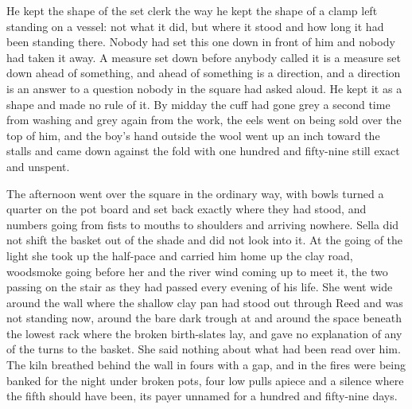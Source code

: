 He kept the shape of the set clerk the way he kept the shape of a clamp left standing on a vessel: not what it did, but where it stood and how long it had been standing there. Nobody had set this one down in front of him and nobody had taken it away. A measure set down before anybody called it is a measure set down ahead of something, and ahead of something is a direction, and a direction is an answer to a question nobody in the square had asked aloud. He kept it as a shape and made no rule of it. By midday the cuff had gone grey a second time from washing and grey again from the work, the eels went on being sold over the top of him, and the boy's hand outside the wool went up an inch toward the stalls and came down against the fold with one hundred and fifty-nine still exact and unspent.

The afternoon went over the square in the ordinary way, with bowls turned a quarter on the pot board and set back exactly where they had stood, and numbers going from fists to mouths to shoulders and arriving nowhere. Sella did not shift the basket out of the shade and did not look into it. At the going of the light she took up the half-pace and carried him home up the clay road, woodsmoke going before her and the river wind coming up to meet it, the two passing on the stair as they had passed every evening of his life. She went wide around the wall where the shallow clay pan had stood out through Reed and was not standing now, around the bare dark trough at  and around the space beneath the lowest rack where the broken birth-slates lay, and gave no explanation of any of the turns to the basket. She said nothing about what had been read over him. The kiln breathed behind the wall in fours with a gap, and in  the fires were being banked for the night under broken pots, four low pulls apiece and a silence where the fifth should have been, its payer unnamed for a hundred and fifty-nine days.

\scenebreak

